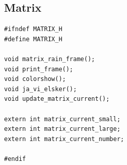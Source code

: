 \documentclass[../main.tex]{subfiles}
\begin{document}
\subsection{Matrix}
\label{apx:matrix}


\label{lst:matrix_h}
\begin{verbatim}
#ifndef MATRIX_H
#define MATRIX_H

void matrix_rain_frame();
void print_frame();
void colorshow();
void ja_vi_elsker();
void update_matrix_current();

extern int matrix_current_small;
extern int matrix_current_large;
extern int matrix_current_number;

#endif

\end{verbatim}
\end{document}
